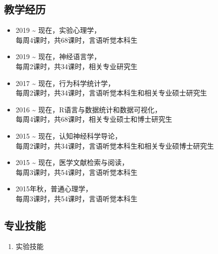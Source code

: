 \documentclass[12pt,]{article}
\providecommand{\tightlist}{%
  \setlength{\itemsep}{0pt}\setlength{\parskip}{0pt}}
\begin{document}
\hypertarget{ux6559ux5b66ux7ecfux5386}{%
\subsection{教学经历}\label{ux6559ux5b66ux7ecfux5386}}

\begin{itemize}
\item
  2019 \textasciitilde{} 现在，实验心理学，\\
  每周4课时，共68课时，言语听觉本科生
\item
  2019 \textasciitilde{} 现在，神经语言学，\\
  每周2课时，共34课时，相关专业研究生
\item
  2017 \textasciitilde{} 现在，行为科学统计学，\\
  每周2课时，共34课时，言语听觉本科生和相关专业硕士研究生
\item
  2016 \textasciitilde{} 现在，R语言与数据统计和数据可视化，\\
  每周4课时，共68课时，相关专业硕士和博士研究生
\item
  2015 \textasciitilde{} 现在，认知神经科学导论，\\
  每周2课时，共34课时，言语听觉本科生和相关专业硕博士研究生
\item
  2015 \textasciitilde{} 现在，医学文献检索与阅读，\\
  每周3课时，共54课时，言语听觉本科生
\item
  2015年秋，普通心理学，\\
  每周3课时，共54课时，言语听觉本科生
\end{itemize}

\hypertarget{ux4e13ux4e1aux6280ux80fd}{%
\subsection{专业技能}\label{ux4e13ux4e1aux6280ux80fd}}

\begin{enumerate}
\def\labelenumi{\arabic{enumi}.}
\tightlist
\item
  实验技能
\end{enumerate}
\end{document}

